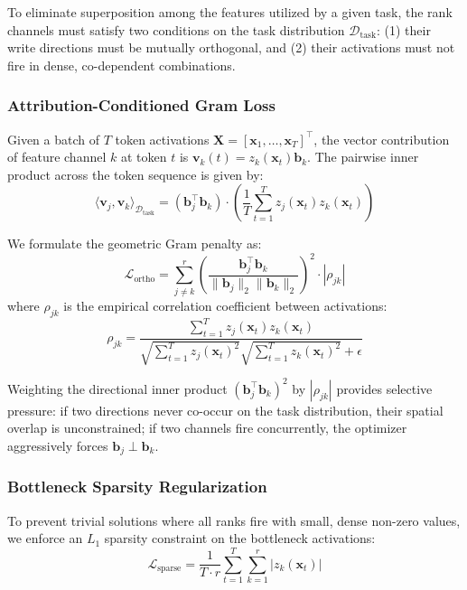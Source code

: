 \documentclass[10pt,twocolumn,letterpaper]{article}
\begin{document}
To eliminate superposition among the features utilized by a given task, the rank channels must satisfy two conditions on the task distribution $\mathcal{D}_{\text{task}}$: (1) their write directions must be mutually orthogonal, and (2) their activations must not fire in dense, co-dependent combinations.

\subsubsection{Attribution-Conditioned Gram Loss}
Given a batch of $T$ token activations $\bm{X} = [\bm{x}_1, \dots, \bm{x}_T]^\top$, the vector contribution of feature channel $k$ at token $t$ is $\bm{v}_k(t) = z_k(\bm{x}_t)\bm{b}_k$. The pairwise inner product across the token sequence is given by:
\begin{equation}
    \langle \bm{v}_j, \bm{v}_k \rangle_{\mathcal{D}_{\text{task}}} = (\bm{b}_j^\top \bm{b}_k) \cdot \left( \frac{1}{T} \sum_{t=1}^T z_j(\bm{x}_t) z_k(\bm{x}_t) \right)
\end{equation}

We formulate the geometric Gram penalty as:
\begin{equation}
    \mathcal{L}_{\text{ortho}} = \sum_{j \neq k}^r \left( \frac{\bm{b}_j^\top \bm{b}_k}{\|\bm{b}_j\|_2 \|\bm{b}_k\|_2} \right)^2 \cdot \left| \rho_{jk} \right|
    \label{eq:l_ortho}
\end{equation}
where $\rho_{jk}$ is the empirical correlation coefficient between activations:
\begin{equation}
    \rho_{jk} = \frac{\sum_{t=1}^T z_j(\bm{x}_t) z_k(\bm{x}_t)}{\sqrt{\sum_{t=1}^T z_j(\bm{x}_t)^2} \sqrt{\sum_{t=1}^T z_k(\bm{x}_t)^2} + \epsilon}
\end{equation}

Weighting the directional inner product $(\bm{b}_j^\top \bm{b}_k)^2$ by $|\rho_{jk}|$ provides selective pressure: if two directions never co-occur on the task distribution, their spatial overlap is unconstrained; if two channels fire concurrently, the optimizer aggressively forces $\bm{b}_j \perp \bm{b}_k$.

\subsubsection{Bottleneck Sparsity Regularization}
To prevent trivial solutions where all ranks fire with small, dense non-zero values, we enforce an $L_1$ sparsity constraint on the bottleneck activations:
\begin{equation}
    \mathcal{L}_{\text{sparse}} = \frac{1}{T \cdot r} \sum_{t=1}^T \sum_{k=1}^r |z_k(\bm{x}_t)|
    \label{eq:l_sparse}
\end{equation}
\end{document}
